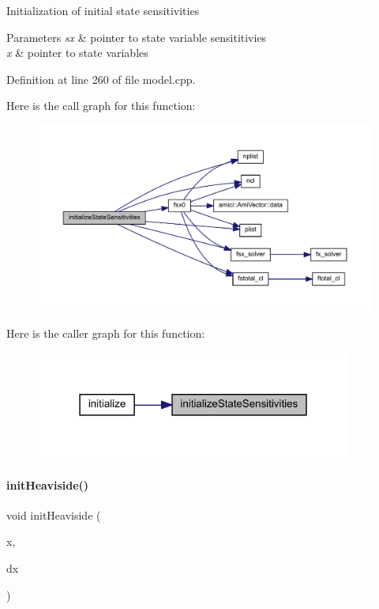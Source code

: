 Initialization of initial state sensitivities 
\begin{DoxyParams}{Parameters}
{\em sx} & pointer to state variable sensititivies \\
\hline
{\em x} & pointer to state variables \\
\hline
\end{DoxyParams}


Definition at line 260 of file model.\+cpp.

Here is the call graph for this function\+:
\nopagebreak
\begin{figure}[H]
\begin{center}
\leavevmode
\includegraphics[width=350pt]{classamici_1_1_model_a9dd884d676d173f976a8e74ef7717198_cgraph}
\end{center}
\end{figure}
Here is the caller graph for this function\+:
\nopagebreak
\begin{figure}[H]
\begin{center}
\leavevmode
\includegraphics[width=295pt]{classamici_1_1_model_a9dd884d676d173f976a8e74ef7717198_icgraph}
\end{center}
\end{figure}
\mbox{\label{classamici_1_1_model_afc1c1ffc33f397ed131f85c8321dd677}} 
\paragraph{\texorpdfstring{initHeaviside()}{initHeaviside()}}
{\footnotesize\ttfamily void init\+Heaviside (\begin{DoxyParamCaption}\item[{\mbox{\hyperlink{classamici_1_1_ami_vector}{Ami\+Vector}} $\ast$}]{x,  }\item[{\mbox{\hyperlink{classamici_1_1_ami_vector}{Ami\+Vector}} $\ast$}]{dx }\end{DoxyParamCaption})}


